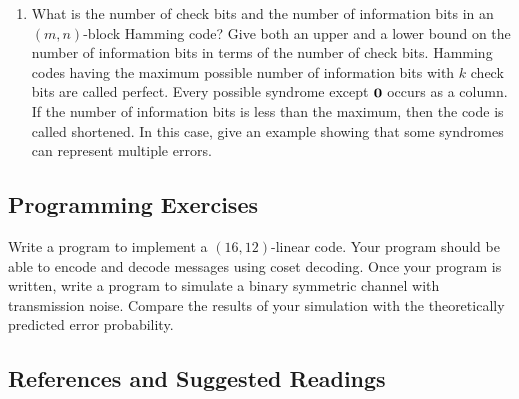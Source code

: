 {\begin{enumerate}
\begin{enumerate}
 \bf\item\rm
What is the number of check bits and the number of information bits in an
$(m,n)$-block Hamming code? Give both an upper and a lower bound on the
number of information bits in terms of the number of check bits.
Hamming codes having the maximum possible number of information bits
with $k$ check bits are called {\bfi
perfect}. Every possible syndrome except
${\bold 0}$ occurs as a column. If the number of information bits is
less than the maximum, then the code is called {\bfi
shortened}. In this case, give an example
showing that some syndromes can represent multiple errors.  
 
\end{enumerate}
 
 
\end{enumerate}
}
 
 
\subsection*{Programming Exercises}
 
 
{\small
Write a program to implement a $(16, 12)$-linear code.  Your program
should be able to encode and decode messages using coset decoding.
Once your program is written, write a program to simulate a binary
symmetric channel with transmission noise.  Compare the results of
your simulation with the theoretically predicted error probability. 
}
 
 
\subsection*{References and Suggested Readings}
 
